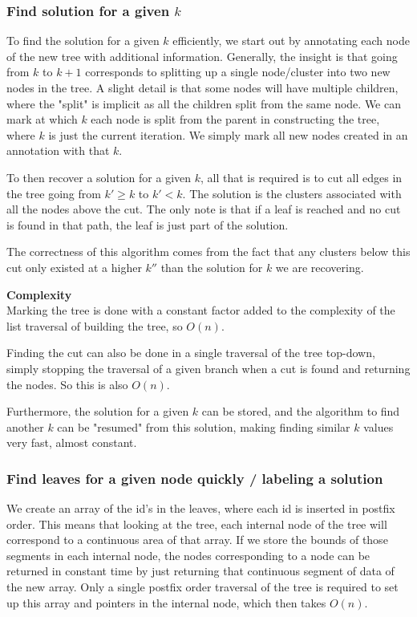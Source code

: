 \subsubsection{Find solution for a given $k$}
To find the solution for a given $k$ efficiently, we start out by annotating each node of the new tree with additional information. Generally, the insight is that going from $k$ to $k+1$ corresponds to splitting up a single node/cluster into two new nodes in the tree. A slight detail is that some nodes will have multiple children, where the "split" is implicit as all the children split from the same node. We can mark at which $k$ each node is split from the parent in constructing the tree, where $k$ is just the current iteration. We simply mark all new nodes created in an annotation with that $k$.

To then recover a solution for a given $k$, all that is required is to cut all edges in the tree going from $k' \geq k$ to $k' < k$. The solution is the clusters associated with all the nodes above the cut. The only note is that if a leaf is reached and no cut is found in that path, the leaf is just part of the solution. 

The correctness of this algorithm comes from the fact that any clusters below this cut only existed at a higher $k''$ than the solution for $k$ we are recovering.


\textbf{Complexity}\\
Marking the tree is done with a constant factor added to the complexity of the list traversal of building the tree, so $O(n)$. 

Finding the cut can also be done in a single traversal of the tree top-down, simply stopping the traversal of a given branch when a cut is found and returning the nodes. So this is also $O(n)$.

Furthermore, the solution for a given $k$ can be stored, and the algorithm to find another $k$ can be "resumed" from this solution, making finding similar $k$ values very fast, almost constant. 





\subsubsection{Find leaves for a given node quickly / labeling a solution}
We create an array of the id's in the leaves, where each id is inserted in postfix order. This means that looking at the tree, each internal node of the tree will correspond to a continuous area of that array. If we store the bounds of those segments in each internal node, the nodes corresponding to a node can be returned in constant time by just returning that continuous segment of data of the new array. Only a single postfix order traversal of the tree is required to set up this array and pointers in the internal node, which then takes $O(n)$.

